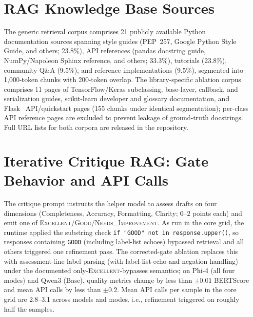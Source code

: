 \documentclass[pdflatex,sn-mathphys-ay]{sn-jnl}%
\theoremstyle{thmstyleone}%
\theoremstyle{thmstyletwo}%
\theoremstyle{thmstylethree}%
\begin{document}
\section{RAG Knowledge Base Sources}
\label{sec:appendix-rag-corpus}
The generic retrieval corpus comprises 21 publicly available Python documentation sources spanning style guides (PEP~257, Google Python Style Guide, and others; 23.8\%), API references (pandas docstring guide, NumPy/Napoleon Sphinx reference, and others; 33.3\%), tutorials (23.8\%), community Q\&A (9.5\%), and reference implementations (9.5\%), segmented into 1,000-token chunks with 200-token overlap. {\color{blue}
The library-specific ablation corpus comprises 11 pages of TensorFlow/Keras subclassing, base-layer, callback, and serialization guides, scikit-learn developer and glossary documentation, and Flask~\cite{flask} API/quickstart pages (155 chunks under identical segmentation); per-class API reference pages are excluded to prevent leakage of ground-truth docstrings. Full URL lists for both corpora are released in the repository.
}


{\color{blue}
\section{Iterative Critique RAG: Gate Behavior and API Calls}
\label{sec:appendix-critique}
The critique prompt instructs the helper model to assess drafts on four dimensions (Completeness, Accuracy, Formatting, Clarity; 0--2 points each) and emit one of \textsc{Excellent}/\textsc{Good}/\textsc{Needs\_Improvement}. As run in the core grid, the runtime applied the substring check \texttt{if "GOOD" not in response.upper()}, so responses containing \texttt{GOOD} (including label-list echoes) bypassed retrieval and all others triggered one refinement pass. The corrected-gate ablation replaces this with assessment-line label parsing (with label-list-echo and negation handling) under the documented only-\textsc{Excellent}-bypasses semantics; on Phi-4 (all four modes) and Qwen3 (Base), quality metrics change by less than $\pm 0.01$ BERTScore and mean API calls by less than $\pm 0.2$. Mean API calls per sample in the core grid are 2.8--3.1 across models and modes, i.e., refinement triggered on roughly half the samples.


}
\end{document}
